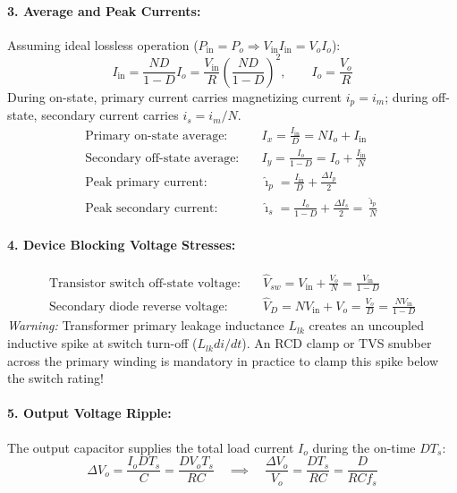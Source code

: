\paragraph{3. Average and Peak Currents:}
Assuming ideal lossless operation ($P_{\mathrm{in}} = P_o \Rightarrow V_{\mathrm{in}} I_{\mathrm{in}} = V_o I_o$):
\begin{equation}
I_{\mathrm{in}} = \frac{N D}{1-D} I_o = \frac{V_{\mathrm{in}}}{R} \left(\frac{N D}{1-D}\right)^2, \qquad I_o = \frac{V_o}{R}
\end{equation}
During on-state, primary current carries magnetizing current $i_p = i_m$; during off-state, secondary current carries $i_s = i_m / N$.
\begin{align}
\text{Primary on-state average:} \quad & I_x = \frac{I_{\mathrm{in}}}{D} = N I_o + I_{\mathrm{in}} \\
\text{Secondary off-state average:} \quad & I_y = \frac{I_o}{1-D} = I_o + \frac{I_{\mathrm{in}}}{N} \\
\text{Peak primary current:} \quad & \hat{\imath}_p = \frac{I_{\mathrm{in}}}{D} + \frac{\Delta I_p}{2} \\
\text{Peak secondary current:} \quad & \hat{\imath}_s = \frac{I_o}{1-D} + \frac{\Delta I_s}{2} = \frac{\hat{\imath}_p}{N}
\end{align}

\paragraph{4. Device Blocking Voltage Stresses:}
\begin{align}
\text{Transistor switch off-state voltage:} \quad & \hat{V}_{sw} = V_{\mathrm{in}} + \frac{V_o}{N} = \frac{V_{\mathrm{in}}}{1-D} \\
\text{Secondary diode reverse voltage:} \quad & \hat{V}_D = N V_{\mathrm{in}} + V_o = \frac{V_o}{D} = \frac{N V_{\mathrm{in}}}{1-D}
\end{align}
\textit{Warning:} Transformer primary leakage inductance $L_{lk}$ creates an uncoupled inductive spike at switch turn-off ($L_{lk} di/dt$). An RCD clamp or TVS snubber across the primary winding is mandatory in practice to clamp this spike below the switch rating!

\paragraph{5. Output Voltage Ripple:}
The output capacitor supplies the total load current $I_o$ during the on-time $D T_s$:
\begin{equation}
\Delta V_o = \frac{I_o D T_s}{C} = \frac{D V_o T_s}{R C} \quad\implies\quad \frac{\Delta V_o}{V_o} = \frac{D T_s}{R C} = \frac{D}{R C f_s}
\end{equation}

